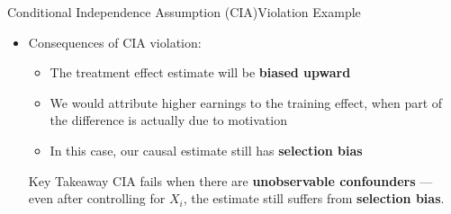 \documentclass[dvipsnames,hyperref={pdfpagelabels=false}]{beamer}
\begin{document}
\begin{frame}{Conditional Independence Assumption (CIA)}{Violation Example}
	\begin{itemize}

		\item Consequences of CIA violation:
					\vspace{0.2cm}
		\begin{itemize}
			\item The treatment effect estimate will be \textbf{biased upward}
			\vspace{0.2cm}
			\item We would attribute higher earnings to the training effect, when part of the difference is actually due to motivation
			\vspace{0.2cm}
			\item In this case, our causal estimate still has \textbf{selection bias}
		\end{itemize}
        \vspace{0.2cm}
\begin{alertblock}{Key Takeaway}
CIA fails when there are \textbf{unobservable confounders} — even after controlling for $X_i$, the estimate still suffers from \textbf{selection bias}.
\end{alertblock}

	\end{itemize}
\end{frame}
\end{document}
